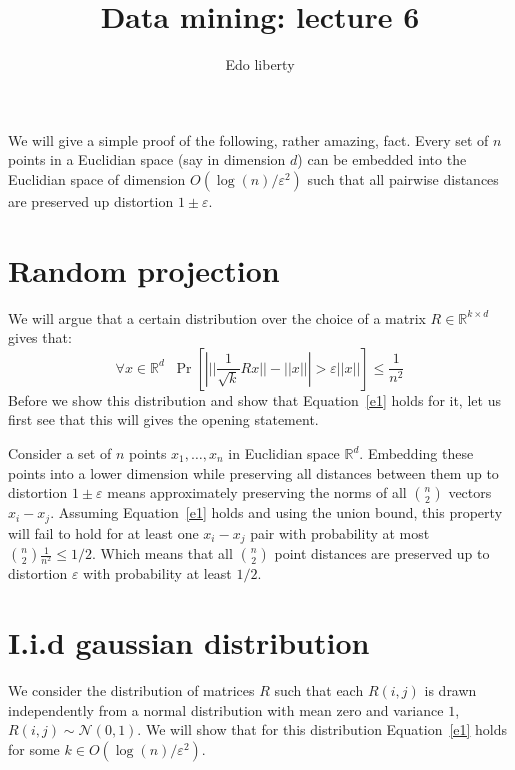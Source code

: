 \documentclass{article}
\title{Data mining: lecture 6} %
\author{Edo liberty}
\date{\nonumber}
\newcommand{\eps}{\varepsilon}
\newcommand{\R}{\mathbb R}
\newcommand{\N}{\mathcal N}
\begin{document}
\maketitle 
We will give a simple proof of the following, rather amazing, fact. Every set of $n$ points 
in a Euclidian space (say in dimension $d$) can be embedded into the Euclidian space of 
dimension $O(\log(n)/\eps^2)$ such that all pairwise distances are preserved up distortion $1\pm \eps$.

\section*{Random projection}
We will argue that a certain distribution over the choice of a matrix $R \in \R^{k \times d}$ gives that:
\begin{equation}
\label{e1}
\forall x \in \R^{d} \;\; \Pr\left[ \left| ||\frac{1}{\sqrt{k}}Rx|| - ||x|| \right| > \eps||x|| \right] \le \frac{1}{n^2} 
\end{equation}
Before we show this distribution and show that Equation~\ref{e1} holds for it, let us first see
that this will gives the opening statement. 

Consider a set of $n$ points $x_1,\ldots, x_n$ in Euclidian space $\R^d$. Embedding these points
into a lower dimension while preserving all distances between
them up to distortion $1\pm \eps$ means approximately preserving the norms of all 
${n \choose 2}$ vectors $x_i - x_j$. Assuming Equation~\ref{e1} holds and using the union 
bound, this property will fail to hold for at least one $x_i - x_j$ pair with probability at most ${n \choose 2}\frac{1}{n^2} \le 1/2$.
Which means that all ${n \choose 2}$ point distances are preserved up to distortion $\eps$ with probability at least $1/2$.


\section{I.i.d gaussian distribution}
We consider the distribution of matrices $R$ such that each $R(i,j)$ is drawn independently from  a
normal distribution with mean zero and variance $1$, $R(i,j) \sim \N(0,1)$. We will show that for this
distribution Equation~\ref{e1} holds for some $k \in O(\log(n)/\eps^2)$.
\end{document}
